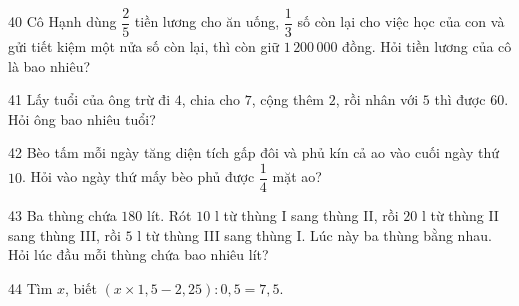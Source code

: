 \gap
\begin{probbox}{40}{}
Cô Hạnh dùng $\dfrac25$ tiền lương cho ăn uống, $\dfrac13$ số còn lại cho việc học của con và gửi tiết kiệm một nửa số còn lại, thì còn giữ $1\,200\,000$ đồng. Hỏi tiền lương của cô là bao nhiêu?
\end{probbox}
\gap
\begin{probbox}{41}{}
Lấy tuổi của ông trừ đi $4$, chia cho $7$, cộng thêm $2$, rồi nhân với $5$ thì được $60$. Hỏi ông bao nhiêu tuổi?
\end{probbox}
\gap
\begin{probbox}{42}{}
Bèo tấm mỗi ngày tăng diện tích gấp đôi và phủ kín cả ao vào cuối ngày thứ $10$. Hỏi vào ngày thứ mấy bèo phủ được $\dfrac14$ mặt ao?
\end{probbox}
\gap
\begin{probbox}{43}{}
Ba thùng chứa $180$ lít. Rót $10$ l từ thùng I sang thùng II, rồi $20$ l từ thùng II sang thùng III, rồi $5$ l từ thùng III sang thùng I. Lúc này ba thùng bằng nhau. Hỏi lúc đầu mỗi thùng chứa bao nhiêu lít?
\end{probbox}
\gap
\begin{probbox}{44}{}
Tìm $x$, biết $(x\times1{,}5-2{,}25):0{,}5=7{,}5$.
\end{probbox}
